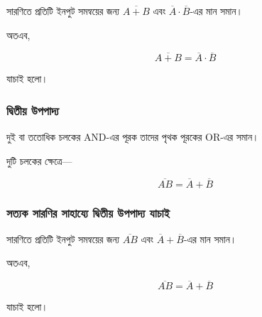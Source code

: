 সারণিতে প্রতিটি ইনপুট সমন্বয়ের জন্য
\(\overline{A+B}\) এবং
\(\overline{A}\cdot\overline{B}\)-এর মান সমান।

অতএব,

\[
\boxed{
\overline{A+B}
=
\overline{A}\cdot\overline{B}
}
\]

যাচাই হলো।


\subsubsection*{দ্বিতীয় উপপাদ্য}

\par\begingroup

দুই বা ততোধিক চলকের
\textenglish{AND}-এর পূরক তাদের পৃথক পূরকের
\textenglish{OR}-এর সমান।
\par\endgroup


দুটি চলকের ক্ষেত্রে—

\[
\boxed{
\overline{AB}
=
\overline{A}+\overline{B}
}
\]

\subsubsection*{সত্যক সারণির সাহায্যে দ্বিতীয় উপপাদ্য যাচাই}

\begin{center}
\scriptsize
{}
\end{center}

সারণিতে প্রতিটি ইনপুট সমন্বয়ের জন্য
\(\overline{AB}\) এবং
\(\overline{A}+\overline{B}\)-এর মান সমান।

অতএব,

\[
\boxed{
\overline{AB}
=
\overline{A}+\overline{B}
}
\]

যাচাই হলো।

